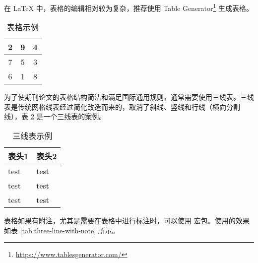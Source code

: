 \documentclass[report, twoside, UTF8, AutoFakeBold = 1, AutoFakeSlant, zihao = -4]{config}
\begin{document}
在 \LaTeX{} 中，表格的编辑相对较为复杂，推荐使用 Table Generator\footnote{\url{https://www.tablesgenerator.com/}} 生成表格。

\begin{table}[H] %
    \centering %
    \caption{表格示例} %
    \label{tab:example} %
    \renewcommand\arraystretch{2.5} %
    \setlength{\tabcolsep}{30pt} %
    \begin{tabular}{|c|c|c|}  %
        \hline %
        2 & 9 & 4 \\ %
        \hline %
        7 & 5 & 3 \\ %
        \hline %
        6 & 1 & 8 \\ %
        \hline %
    \end{tabular}
\end{table}

为了使期刊论文的表格结构简洁和满足国际通用规则，通常需要使用三线表。三线表是传统网格线表经过简化改造而来的，取消了斜线、竖线和行线（横向分割线），表 \ref{tab:three-line} 是一个三线表的案例。

\begin{table}[H] %
    \centering %
    \caption{三线表示例} %
    \label{tab:three-line} %
    \renewcommand\arraystretch{1.2} %
    \setlength{\tabcolsep}{10pt} %
    \begin{tabular}{ll} %
        \toprule[1.5pt] %
        \textbf{表头1} & \textbf{表头2}\\ %
        \midrule[0.8pt] %
        test & test \\ %
        test & test\\ %
        test & test\\ %
        \bottomrule[1.5pt] %
    \end{tabular}
\end{table}

表格如果有附注，尤其是需要在表格中进行标注时，可以使用  宏包。使用的效果如表 \ref{tab:three-line-with-note} 所示。
\end{document}
